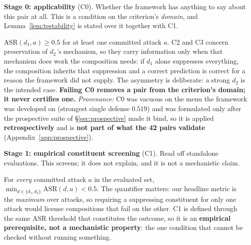 \documentclass{article}
\begin{document}
\smallskip
\noindent\textbf{Stage 0: applicability} (C0). Whether the framework has anything to say about this pair at all. This is a condition on the criterion's \emph{domain}, and Lemma~\ref{lem:testability} is stated over it together with C1.
\begin{description}[topsep=2pt,parsep=0pt,itemsep=3pt,leftmargin=0pt,labelindent=0pt,itemindent=\labelsep]
\item[(C0) The downstream mechanism is load-bearing.] $\mathrm{ASR}(d_1,a) \geq 0.5$ for at least one committed attack $a$. C2 and C3 concern preservation of \emph{$d_2$'s} mechanism, so they carry information only when that mechanism does work the composition needs: if $d_1$ alone suppresses everything, the composition inherits that suppression and a correct prediction is correct for a reason the framework did not supply. The asymmetry is deliberate: a strong \emph{$d_2$} is the intended case. \textbf{Failing C0 removes a pair from the criterion's domain; it never certifies one.} \emph{Provenance:} C0 was vacuous on the menu the framework was developed on (strongest single defense $0.519$) and was formulated only after the prospective suite of \S\ref{sec:prospective} made it bind, so it is applied \textbf{retrospectively} and is \textbf{not part of what the 42 pairs validate} (Appendix~\ref{app:prospective}).
\end{description}

\smallskip
\noindent\textbf{Stage 1: empirical constituent screening} (C1). Read off standalone evaluations. This screens; it does not explain, and it is not a mechanistic claim.
\begin{description}[topsep=2pt,parsep=0pt,itemsep=3pt,leftmargin=0pt,labelindent=0pt,itemindent=\labelsep]
\item[(C1) Individual effectiveness.] For \emph{every} committed attack $a$ in the evaluated set, $\min_{d \in \{d_1,d_2\}} \mathrm{ASR}(d,a) < 0.5$. The quantifier matters: our headline metric is the \emph{maximum} over attacks, so requiring a suppressing constituent for only one attack would license compositions that fail on the other. C1 is defined through the same ASR threshold that constitutes the outcome, so it is an \textbf{empirical prerequisite, not a mechanistic property}: the one condition that cannot be checked without running something.
\end{description}
\end{document}

